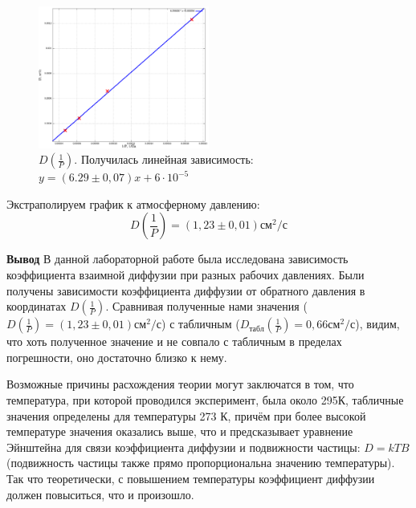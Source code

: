 \documentclass[11pt]{article}
\begin{document}
\begin{enumerate}
    \medskip
    \begin{figure}[H]
    \centering
    \captionsetup{justification=centering}
    \includegraphics[width=0.5\textwidth]{graphD.png}
    \caption{$D(\frac{1}{P})$. Получилась линейная зависимость: $y = (6.29 \pm 0,07)x + 6 \cdot 10^{-5}$}
    \end{figure}


    Экстраполируем график к атмосферному давлению:
    \[D(\frac{1}{P}) = (1,23\pm 0,01)см^2/с\]




\end{enumerate}


\par \textbf{Вывод} В данной лабораторной работе была исследована зависимость коэффициента взаимной диффузии при разных рабочих давлениях. Были получены зависимости коэффициента диффузии от обратного давления в координатах $D(\frac{1}{P})$. Сравнивая полученные нами значения ($D(\frac{1}{P}) = (1,23 \pm 0,01) см^2/с$) с табличным ($D_{табл}(\frac{1}{P}) = 0,66 см^2/с$), видим, что хоть полученное значение и не совпало с табличным в пределах погрешности, оно достаточно близко к нему. 

Возможные причины расхождения теории могут заключатся в том, что температура, при которой проводился эксперимент, была около 295К, табличные значения определены для температуры 273 К, причём при более высокой температуре значения оказались выше, что и предсказывает уравнение Эйнштейна для связи коэффициента диффузии и подвижности частицы: $D = kTB$ (подвижность частицы также прямо пропорциональна значению температуры). Так что теоретически, с повышением температуры коэффициент диффузии должен повыситься, что и произошло.
\end{document}
